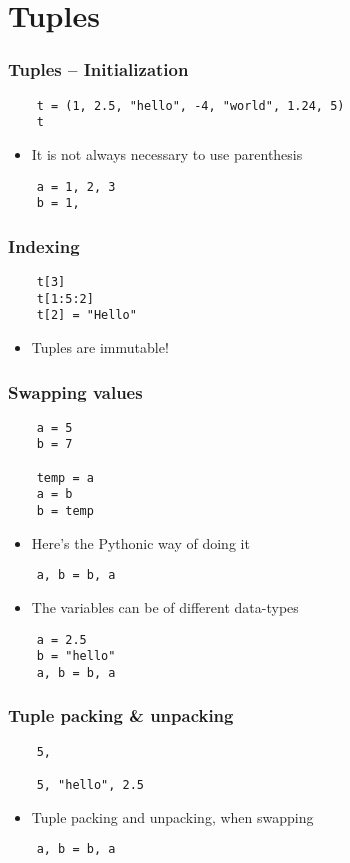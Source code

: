 \section{Tuples}

\begin{frame}[fragile]
  \frametitle{Tuples -- Initialization}
  \begin{lstlisting}
    t = (1, 2.5, "hello", -4, "world", 1.24, 5)
    t
  \end{lstlisting}
  \begin{itemize}
  \item It is not always necessary to use parenthesis
  \end{itemize}
  \begin{lstlisting}
    a = 1, 2, 3 
    b = 1, 
  \end{lstlisting}
\end{frame}

\begin{frame}[fragile]
  \frametitle{Indexing}
  \begin{lstlisting}
    t[3]
    t[1:5:2]
    t[2] = "Hello"
  \end{lstlisting}
  \begin{itemize}
  \item \alert{Tuples are immutable!}
  \end{itemize}
\end{frame}

\begin{frame}[fragile]
  \frametitle{Swapping values}
  \begin{lstlisting}
    a = 5
    b = 7

    temp = a
    a = b
    b = temp
  \end{lstlisting}
  \begin{itemize}
  \item Here's the Pythonic way of doing it
  \end{itemize}
  \begin{lstlisting}
    a, b = b, a
  \end{lstlisting}
  \begin{itemize}
  \item The variables can be of different data-types
  \end{itemize}
  \begin{lstlisting}
    a = 2.5
    b = "hello"
    a, b = b, a
  \end{lstlisting}
\end{frame}

\begin{frame}[fragile]
  \frametitle{Tuple packing \& unpacking}
  \begin{lstlisting}
    5,

    5, "hello", 2.5
  \end{lstlisting}
  \begin{itemize}
  \item Tuple packing and unpacking, when swapping
  \end{itemize}
  \begin{lstlisting}
    a, b = b, a
  \end{lstlisting}
\end{frame}

